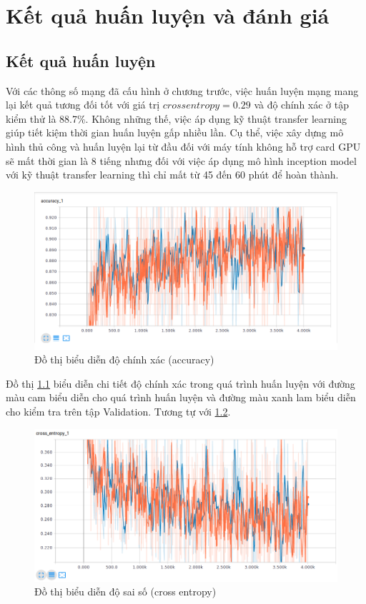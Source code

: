 \chapter{Kết quả huấn luyện và đánh giá}
\section{Kết quả huấn luyện}
Với các thông số mạng đã cấu hình ở chương trước, việc huấn luyện mạng mang lại kết quả tương đối tốt với giá trị \(crossentropy = 0.29\) và độ chính xác ở tập kiểm thử là 88.7\%. Không những thế, việc áp dụng kỹ thuật transfer learning giúp tiết kiệm thời gian huấn luyện gấp nhiều lần. Cụ thể, việc xây dựng mô hình thủ công và huấn luyện lại từ đầu đối với máy tính không hỗ trợ card GPU sẽ mất thời gian là 8 tiếng nhưng đối với việc áp dụng mô hình inception model với kỹ thuật transfer learning thì chỉ mất từ 45 đến 60 phút để hoàn thành.\par

	\begin{figure}[h!]
		\centering
		\includegraphics[scale=0.5]{charts/accuracy.png}
		\caption{Đồ thị biểu diễn độ chính xác (accuracy)}
		\label{fig:accuracy}
	\end{figure}

Đồ thị \ref{fig:accuracy} biểu diễn chi tiết độ chính xác trong quá trình huấn luyện với đường màu cam biểu diễn cho quá trình huấn luyện và đường màu xanh lam biểu diễn cho kiểm tra trên tập Validation. Tương tự với \ref{fig:cross_entropy}.

	\begin{figure}[h!]
		\centering
		\includegraphics[scale=0.5]{charts/cross-entropy.png}
		\caption{Đồ thị biểu diễn độ sai số (cross entropy)}
		\label{fig:cross_entropy}
	\end{figure}

